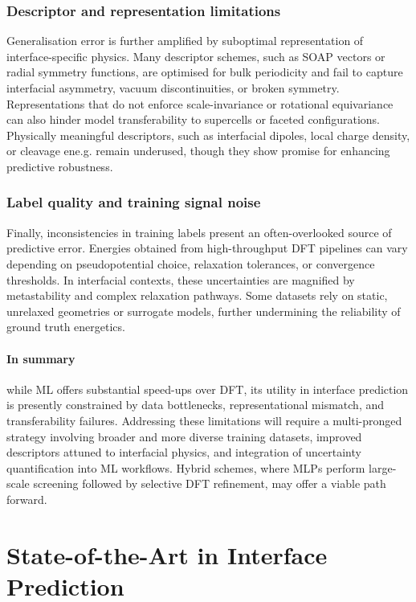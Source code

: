 \subsubsection{Descriptor and representation limitations}

Generalisation error is further amplified by suboptimal representation of interface-specific physics. Many descriptor
schemes, such as SOAP vectors or radial symmetry functions, are optimised for bulk periodicity and fail to capture
interfacial asymmetry, vacuum discontinuities, or broken symmetry. Representations that do not enforce scale-invariance
or rotational equivariance can also hinder model transferability to supercells or faceted configurations. Physically
meaningful descriptors, such as interfacial dipoles, local charge density, or cleavage ene.g. remain underused, though
they show promise for enhancing predictive robustness.

\subsubsection{Label quality and training signal noise}

Finally, inconsistencies in training labels present an often-overlooked source of predictive error. Energies obtained
from high-throughput DFT pipelines can vary depending on pseudopotential choice, relaxation tolerances, or convergence
thresholds. In interfacial contexts, these uncertainties are magnified by metastability and complex relaxation
pathways. Some datasets rely on static, unrelaxed geometries or surrogate models, further undermining the reliability
of ground truth energetics.

\paragraph{In summary} while ML offers substantial speed-ups over DFT, its utility in interface prediction is presently
constrained by data bottlenecks, representational mismatch, and transferability failures. Addressing these limitations
will require a multi-pronged strategy involving broader and more diverse training datasets, improved descriptors
attuned to interfacial physics, and integration of uncertainty quantification into ML workflows. Hybrid schemes, where
MLPs perform large-scale screening followed by selective DFT refinement, may offer a viable path forward.


\section{State-of-the-Art in Interface Prediction}
\label{section:state_of_the_art}

